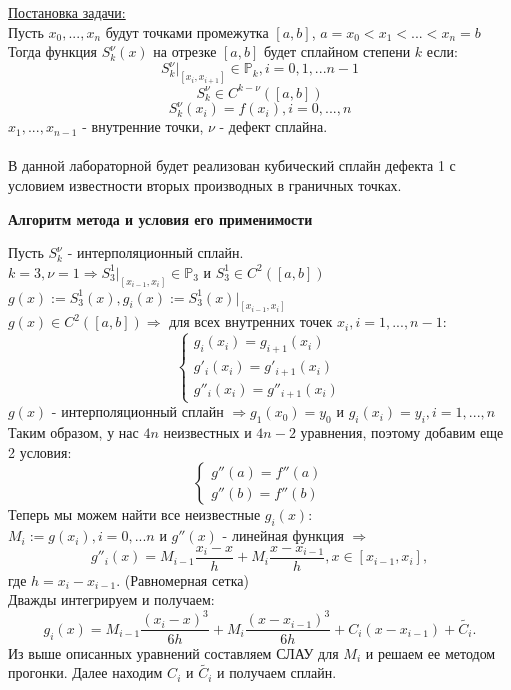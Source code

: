 \documentclass{article}
\begin{document}
	\underline{Постановка задачи:}\\
	Пусть $x_0,...,x_n$ будут точками промежутка $[a, b]$, $a = x_0 < x_1 < ... < x_n = b$\\
	Тогда функция $S_k^{\nu}(x)$ на отрезке $[a,b]$ будет сплайном степени $k$ если:
	$$S_k^{\nu}|_{[x_i, x_{i+1}]} \in \mathbb{P}_k, i = 0,1,...n-1$$
	$$S_k^{\nu} \in C^{k-\nu}([a,b])$$
	$$S_k^{\nu}(x_i) = f(x_i), i = 0,...,n$$
	$x_1,...,x_{n-1}$ - внутренние точки, $\nu$ - дефект сплайна.\\
	\\
	В данной лабораторной будет реализован кубический сплайн дефекта 1 с условием известности вторых производных в граничных точках.\\
	\begin{center} \textbf{Алгоритм метода и условия его применимости}\end{center}
	Пусть $S_k^{\nu}$ - интерполяционный сплайн.\\ 
	$k = 3, \nu = 1 \Rightarrow S_3^1|_{[x_{i-1}, x_i]} \in \mathbb{P}_3$ и $S_3^1 \in C^2([a,b])$\\
	$g(x) := S_3^1(x), g_i(x):=S_3^1(x)|_{[x_{i-1}, x_i]}$\\
	$g(x) \in C^2([a, b]) \Rightarrow$ для всех внутренних точек $x_i, i = 1,...,n-1$:
	$$\begin{cases}
		g_i(x_i) = g_{i+1}(x_i)\\
		g'_i(x_i) = g'_{i+1}(x_i)\\
		g''_i(x_i) = g''_{i+1}(x_i)
	\end{cases}$$
	$g(x)$ - интерполяционный сплайн $\Rightarrow g_1(x_0) = y_0$ и $g_i(x_i) = y_i, i = 1,...,n$\\
	Таким образом, у нас $4n$ неизвестных и $4n-2$ уравнения, поэтому добавим еще 2 условия:
	$$\begin{cases}
		g''(a) = f''(a)\\
		g''(b) = f''(b)
	\end{cases}$$
	Теперь мы можем найти все неизвестные $g_i(x)$:\\
	$M_i := g(x_i), i=0,...n$ и $g''(x)$ - линейная функция $\Rightarrow$
	$$g''_i(x) = M_{i-1}\frac{x_i - x}{h} + M_i\frac{x - x_{i-1}}{h}, x\in[x_{i-1}, x_i],$$ 
	где $h = x_i - x_{i-1}$. (Равномерная сетка)\\
	Дважды интегрируем и получаем:
	$$g_i(x) = M_{i-1}\frac{(x_i - x)^3}{6h} + M_i\frac{(x - x_{i-1})^3}{6h} + C_i(x-x_{i-1}) + \tilde{C_i}.$$
	Из выше описанных уравнений составляем СЛАУ для $M_i$ и решаем ее методом прогонки. Далее находим $C_i$ и $\tilde{C_i}$ и получаем сплайн.\\
\end{document}
